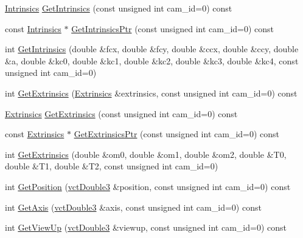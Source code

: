 \begin{DoxyCompactItemize}
\item 
\hyperlink{classsvl_camera_geometry_a864f6359614466009baca0666e6bc08e}{Intrinsics} \hyperlink{classsvl_camera_geometry_a9049f85393185b342b39a0aba9ec14de}{Get\+Intrinsics} (const unsigned int cam\+\_\+id=0) const 
\item 
const \hyperlink{classsvl_camera_geometry_a864f6359614466009baca0666e6bc08e}{Intrinsics} $\ast$ \hyperlink{classsvl_camera_geometry_a7b7772459fd731c625f64a343023d818}{Get\+Intrinsics\+Ptr} (const unsigned int cam\+\_\+id=0) const 
\item 
int \hyperlink{classsvl_camera_geometry_ac2deb86c967aeb2797e328ef7d3b42c4}{Get\+Intrinsics} (double \&fcx, double \&fcy, double \&ccx, double \&ccy, double \&a, double \&kc0, double \&kc1, double \&kc2, double \&kc3, double \&kc4, const unsigned int cam\+\_\+id=0)
\item 
int \hyperlink{classsvl_camera_geometry_a5627c4fbfee0d2c391ba54ef444409a6}{Get\+Extrinsics} (\hyperlink{classsvl_camera_geometry_a6954baa4bd0cc3577af09e13b1c18545}{Extrinsics} \&extrinsics, const unsigned int cam\+\_\+id=0) const 
\item 
\hyperlink{classsvl_camera_geometry_a6954baa4bd0cc3577af09e13b1c18545}{Extrinsics} \hyperlink{classsvl_camera_geometry_ae0177217a0452897bc6bb6d0cc718525}{Get\+Extrinsics} (const unsigned int cam\+\_\+id=0) const 
\item 
const \hyperlink{classsvl_camera_geometry_a6954baa4bd0cc3577af09e13b1c18545}{Extrinsics} $\ast$ \hyperlink{classsvl_camera_geometry_a772432f0f411391070012c2b9361e115}{Get\+Extrinsics\+Ptr} (const unsigned int cam\+\_\+id=0) const 
\item 
int \hyperlink{classsvl_camera_geometry_a5af0599de7a1c812d20a6bce812995f4}{Get\+Extrinsics} (double \&om0, double \&om1, double \&om2, double \&T0, double \&T1, double \&T2, const unsigned int cam\+\_\+id=0)
\item 
int \hyperlink{classsvl_camera_geometry_a0c5216ce427da9f4cb0c1bec17507d8d}{Get\+Position} (\hyperlink{vct_fixed_size_vector_types_8h_a4a89122c9d7f72c3f31fe8126e17c3af}{vct\+Double3} \&position, const unsigned int cam\+\_\+id=0) const 
\item 
int \hyperlink{classsvl_camera_geometry_aee4f24c1842818b52709445e42b26aa2}{Get\+Axis} (\hyperlink{vct_fixed_size_vector_types_8h_a4a89122c9d7f72c3f31fe8126e17c3af}{vct\+Double3} \&axis, const unsigned int cam\+\_\+id=0) const 
\item 
int \hyperlink{classsvl_camera_geometry_a65a6b7d0566605ccd3430c7bdcff5155}{Get\+View\+Up} (\hyperlink{vct_fixed_size_vector_types_8h_a4a89122c9d7f72c3f31fe8126e17c3af}{vct\+Double3} \&viewup, const unsigned int cam\+\_\+id=0) const 

\end{DoxyCompactItemize}
